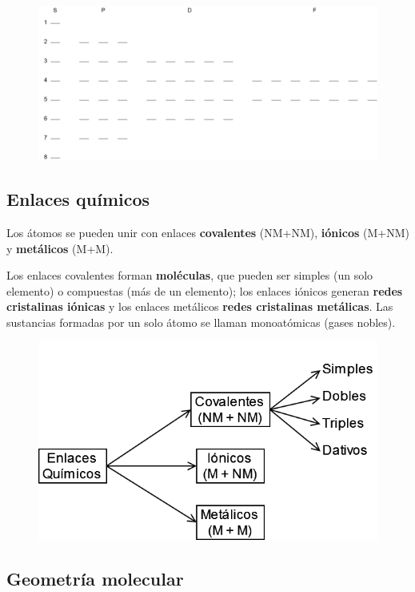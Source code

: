\begin{figure}[H]
    \centering
    \includegraphics[width=0.8\linewidth]{Images/orbitales.png}
\end{figure}


\subsection*{Enlaces químicos}

Los átomos se pueden unir con enlaces \textbf{covalentes} (NM+NM), \textbf{iónicos} (M+NM) y \textbf{metálicos} (M+M). 

\sskip 
Los enlaces covalentes forman \textbf{moléculas}, que pueden ser simples (un solo elemento) o compuestas (más de un elemento); los enlaces iónicos generan \textbf{redes cristalinas iónicas} y los enlaces metálicos \textbf{redes cristalinas metálicas}. Las sustancias formadas por un solo átomo se llaman monoatómicas (gases nobles).

\begin{figure}[H]
    \centering
    \includegraphics[width=0.7\linewidth]{Images/enlaces_quimicos.png}
\end{figure}


\subsection*{Geometría molecular}

